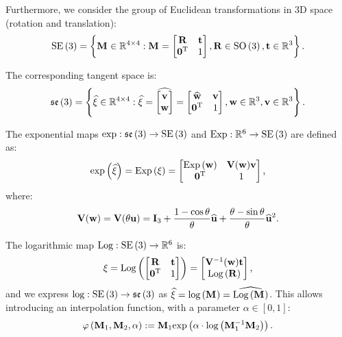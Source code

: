 Furthermore, we consider the group of Euclidean transformations in 3D space (rotation and translation):
\begin{equation}
	\operatorname{SE}\left(3\right)= \left\{
	\mathbf{M}_{} \in {\mathbb{R}}^{4\times4} : \mathbf{M}_{} =
	\begin{bmatrix}
		\mathbf{R} & \mathbf{t} \\ {\mathbf{0}}^\text{T} & 1
	\end{bmatrix}, \mathbf{R} \in \operatorname{SO}\left(3\right), \mathbf{t} \in {\mathbb{R}}^3
	\right\}\text{.}
\end{equation}

The corresponding tangent space is:
\begin{equation}
	\mathfrak{se}\left(3\right) = \left\{
	\widehat{\xi} \in {\mathbb{R}}^{4\times4} : \widehat{\xi} =
	\widehat{\begin{bmatrix}
			\mathbf{v} \\ \mathbf{w}
		\end{bmatrix}} = \begin{bmatrix}
		\widehat{\mathbf{w}}                & \mathbf{v} \\
		{\mathbf{0}}^\text{T} & 1
	\end{bmatrix}, \mathbf{w} \in {\mathbb{R}}^3, \mathbf{v} \in {\mathbb{R}}^3
	\right\}\text{.}
\end{equation}

The exponential maps $\text{exp}: \mathfrak{se}\left(3\right) \rightarrow \operatorname{SE}\left(3\right)$ and $\text{Exp} :{\mathbb{R}}^6 \rightarrow \operatorname{SE}\left(3\right)$ are defined as:
\begin{equation}
	\text{exp}\left({\widehat{\xi}}\right) = \text{Exp}\left({\xi}\right) = \begin{bmatrix}
		\text{Exp}\left({\mathbf{w}}\right)       & \mathbf{V}(\mathbf{w})\mathbf{v} \\
		{\mathbf{0}}^\text{T} & 1
	\end{bmatrix}\text{,}
\end{equation}
where:
\begin{equation}
	\mathbf{V}(\mathbf{w}) = \mathbf{V}(\theta\mathbf{u})  = \mathbf{I}_3 + \frac{1-\cos\theta}{\theta}\widehat{\mathbf{u}} + \frac{\theta-\sin\theta}{\theta}\widehat{\mathbf{u}}^2\text{.}
\end{equation}

The logarithmic map $\text{Log} :\operatorname{SE}\left(3\right) \rightarrow {\mathbb{R}}^6$ is:
\begin{equation}
	\xi = \text{Log}\left({\begin{bmatrix}
			\mathbf{R} & \mathbf{t} \\ {\mathbf{0}}^\text{T} & 1
		\end{bmatrix}}\right) = \begin{bmatrix}
		\mathbf{V}^{-1}(\mathbf{w}) \mathbf{t} \\
		\text{Log}\left({\mathbf{R}}\right)
	\end{bmatrix}\text{,}
\end{equation}
and we express $\text{log} :\operatorname{SE}\left(3\right) \rightarrow \mathfrak{se}\left(3\right)$ as $\widehat{\xi} = \text{log}\left({\mathbf{M}_{}}\right) = \widehat{\text{Log}\left({\mathbf{M}_{}}\right)}$. This allows introducing an interpolation function, with a parameter $\alpha \in \left[0, 1\right]$:
\begin{equation}
	\label{eq:se3-interpolation}
	\varphi\left(\mathbf{M}_{1}, \mathbf{M}_{2}, \alpha\right) :=
	\mathbf{M}_{1} \text{exp}\left({\alpha \cdot \text{log}\left({\mathbf{M}_{1}^{-1} \mathbf{M}_{2}}\right)}\right)
	\text{.}
\end{equation}

